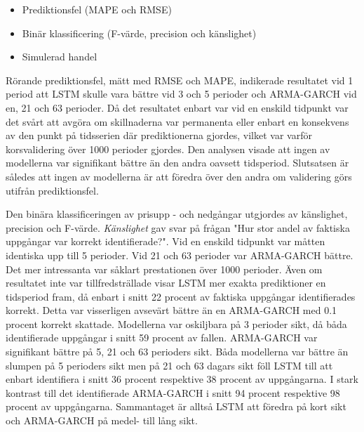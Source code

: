 \documentclass[11pt]{article}
\numberwithin{equation}{section}
\numberwithin{table}{section}
\numberwithin{figure}{section}
\begin{document}
\begin{itemize}
    
\item Prediktionsfel (MAPE och RMSE)

\item Binär klassificering (F-värde, precision och känslighet)

\item Simulerad handel 
\end{itemize}

Rörande prediktionsfel, mätt med RMSE och MAPE, indikerade resultatet vid 1 period att LSTM skulle vara bättre vid 3 och 5 perioder och ARMA-GARCH vid en, 21 och 63 perioder. Då det resultatet enbart var vid en enskild tidpunkt var det svårt att avgöra om skillnaderna var permanenta eller enbart en konsekvens av den punkt på tidsserien där prediktionerna gjordes, vilket var varför korsvalidering över 1000 perioder gjordes. Den analysen visade att ingen av modellerna var signifikant bättre än den andra oavsett tidsperiod. Slutsatsen är således att ingen av modellerna är att föredra över den andra om validering görs utifrån prediktionsfel. 

Den binära klassificeringen av prisupp - och nedgångar utgjordes av känslighet, precision och F-värde. \textit{Känslighet} gav svar på frågan "Hur stor andel av faktiska uppgångar var korrekt identifierade?". Vid en enskild tidpunkt var måtten identiska upp till 5 perioder. Vid 21 och 63 perioder var ARMA-GARCH bättre. Det mer intressanta var såklart prestationen över 1000 perioder. Även om resultatet inte var tillfredsträllade visar LSTM mer exakta prediktioner en tidsperiod fram, då enbart i snitt 22 procent av faktiska uppgångar identifierades korrekt. Detta var visserligen avsevärt bättre än en ARMA-GARCH med 0.1 procent korrekt skattade. Modellerna var oskiljbara på 3 perioder sikt, då båda identifierade uppgångar i snitt 59 procent av fallen. ARMA-GARCH var signifikant bättre på 5, 21 och 63 perioders sikt. Båda modellerna var bättre än slumpen på 5 perioders sikt men på 21 och 63 dagars sikt föll LSTM till att enbart identifiera i snitt 36 procent respektive 38 procent av uppgångarna. I stark kontrast till det identifierade ARMA-GARCH i snitt 94 procent respektive 98 procent av uppgångarna. Sammantaget är alltså LSTM att föredra på kort sikt och ARMA-GARCH på medel- till lång sikt.
\end{document}
